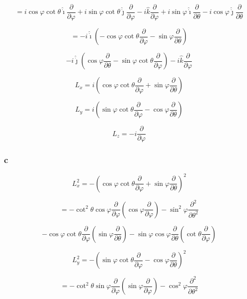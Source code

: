\documentclass[12pt]{article}
\begin{document}
\[
    = i \cos{\varphi} \cot{\theta} \hat{\dot{\imath}} \frac{\partial}{\partial \varphi}
    + i \sin{\varphi} \cot{\theta} \hat{\dot{\jmath}} \frac{\partial}{\partial \varphi}
    - i \hat{k} \frac{\partial}{\partial \varphi}
    + i \sin{\varphi} \hat{\dot{\imath}} \frac{\partial}{\partial \theta}
    - i \cos{\varphi} \hat{\dot{\jmath}} \frac{\partial}{\partial \theta}
\]

\[
    = - i \hat{\dot{\imath}}
    \left(
    -\cos{\varphi} \cot{\theta}\frac{\partial}{\partial \varphi}
    - \sin{\varphi} \frac{\partial}{\partial \theta}
    \right)
\]

\[
    - i \hat{\dot{\jmath}}
    \left(
    \cos{\varphi} \frac{\partial}{\partial \theta}
    -\sin{\varphi} \cot{\theta}\frac{\partial}{\partial \varphi}
    \right)
    - i \hat{k} \frac{\partial}{\partial \varphi}
\]

\[
    L_x = i
    \left(
    \cos{\varphi} \cot{\theta}\frac{\partial}{\partial \varphi}
    + \sin{\varphi} \frac{\partial}{\partial \theta}
    \right)
\]

\[
    L_y = i
    \left(
    \sin{\varphi} \cot{\theta}\frac{\partial}{\partial \varphi}
    -\cos{\varphi} \frac{\partial}{\partial \theta}
    \right)
\]

\[
    L_z = - i \frac{\partial}{\partial \varphi}
\]

\subsubsection{c}

\[
    L_x^2 =
    -{\left(
    \cos{\varphi} \cot{\theta}\frac{\partial}{\partial \varphi}
    + \sin{\varphi} \frac{\partial}{\partial \theta}
    \right)}^2
\]

\[
    = - \cot^2{\theta} \cos{\varphi} \frac{\partial}{\partial \varphi}
    \left(\cos{\varphi} \frac{\partial}{\partial \varphi}\right)
    - \sin^2{\varphi} \frac{\partial^2}{\partial \theta^2}
\]

\[
    - \cos{\varphi} \cot{\theta}\frac{\partial}{\partial \varphi}
    \left(\sin{\varphi} \frac{\partial}{\partial \theta}\right)
    - \sin{\varphi} \cos{\varphi} \frac{\partial}{\partial \theta}
    \left(\cot{\theta}\frac{\partial}{\partial \varphi}\right)
\]

\[
    L_y^2 =
    -{\left(
    \sin{\varphi} \cot{\theta}\frac{\partial}{\partial \varphi}
    - \cos{\varphi} \frac{\partial}{\partial \theta}
    \right)}^2
\]

\[
    = - \cot^2{\theta} \sin{\varphi} \frac{\partial}{\partial \varphi}
    \left(\sin{\varphi} \frac{\partial}{\partial \varphi}\right)
    - \cos^2{\varphi} \frac{\partial^2}{\partial \theta^2}
\]
\end{document}
